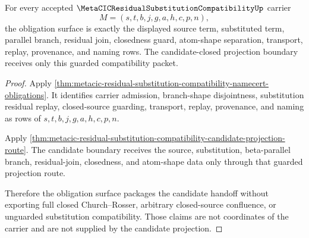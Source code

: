 \begin{theorem}
\label{thm:metacic-residual-substitution-obligation-closure-surface}
For every accepted $\MetaCICResidualSubstitutionCompatibilityUp$ carrier
$$
M=(s,t,b,j,g,a,h,c,p,n),
$$
the obligation surface is exactly the displayed source term, substituted term, parallel branch, residual join, closedness guard, atom-shape separation, transport, replay, provenance, and naming rows. The candidate-closed projection boundary receives only this guarded compatibility packet.
\end{theorem}
\begin{proof}
Apply \autoref{thm:metacic-residual-substitution-compatibility-namecert-obligations}. It identifies carrier admission, branch-shape disjointness, substitution residual replay, closed-source guarding, transport, replay, provenance, and naming as rows of $s,t,b,j,g,a,h,c,p,n$.

Apply \autoref{thm:metacic-residual-substitution-compatibility-candidate-projection-route}. The candidate boundary receives the source, substitution, beta-parallel branch, residual-join, closedness, and atom-shape data only through that guarded projection route.

Therefore the obligation surface packages the candidate handoff without exporting full closed Church--Rosser, arbitrary closed-source confluence, or unguarded substitution compatibility. Those claims are not coordinates of the carrier and are not supplied by the candidate projection.
\end{proof}




